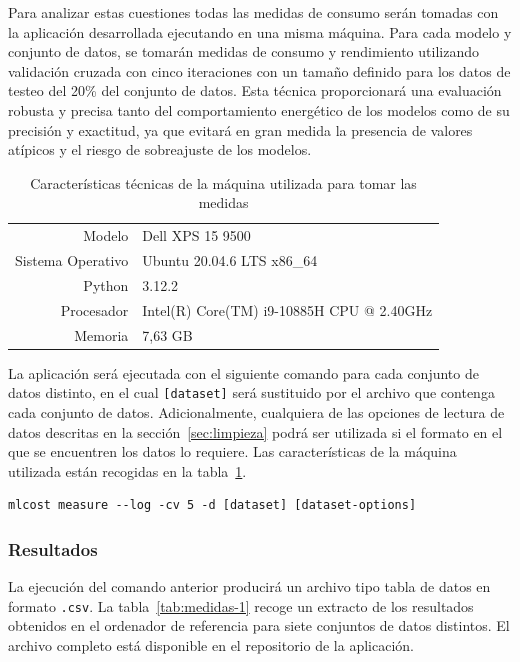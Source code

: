 Para analizar estas cuestiones todas las medidas de consumo serán tomadas con la aplicación desarrollada ejecutando en una misma máquina. Para cada modelo y conjunto de datos, se tomarán medidas de consumo y rendimiento utilizando validación cruzada con cinco iteraciones con un tamaño definido para los datos de testeo del 20\% del conjunto de datos. Esta técnica proporcionará una evaluación robusta y precisa tanto del comportamiento energético de los modelos como de su precisión y exactitud, ya que evitará en gran medida la presencia de valores atípicos y el riesgo de sobreajuste de los modelos.

\begin{table}[h]
    \centering
    \begin{tabular}{rl}
         Modelo & Dell XPS 15 9500\\
         Sistema Operativo & Ubuntu 20.04.6 LTS x86\_64\\
         Python & 3.12.2\\
         Procesador & Intel(R) Core(TM) i9-10885H CPU @ 2.40GHz\\
         Memoria & 7,63 GB\\
    \end{tabular}
    \caption{Características técnicas de la máquina utilizada para tomar las medidas}
    \label{tab:caracteristicas-tecnicas}
\end{table}

La aplicación será ejecutada con el siguiente comando para cada conjunto de datos distinto, en el cual \texttt{[dataset]} será sustituido por el archivo que contenga cada conjunto de datos. Adicionalmente, cualquiera de las opciones de lectura de datos descritas en la sección~\ref{sec:limpieza} podrá ser utilizada si el formato en el que se encuentren los datos lo requiere. Las características de la máquina utilizada están recogidas en la tabla~\ref{tab:caracteristicas-tecnicas}.
\begin{verbatim}
mlcost measure --log -cv 5 -d [dataset] [dataset-options]
\end{verbatim}

\subsubsection{Resultados}

La ejecución del comando anterior producirá un archivo tipo tabla de datos en formato \texttt{.csv}. La tabla~\ref{tab:medidas-1} recoge un extracto de los resultados obtenidos en el ordenador de referencia para siete conjuntos de datos distintos. El archivo completo está disponible en el repositorio de la aplicación.

